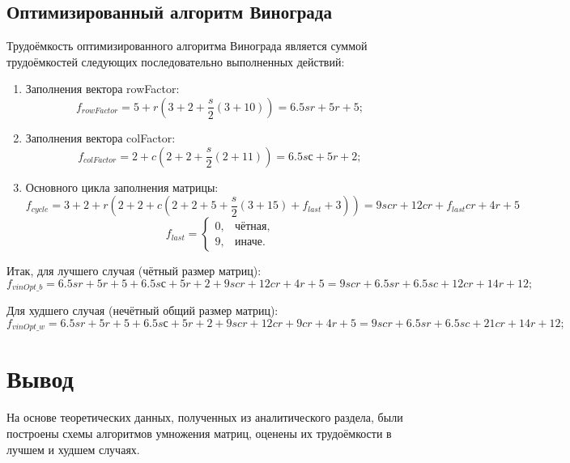 \documentclass[12pt]{report}
\begin{document}
\subsection{Оптимизированный алгоритм Винограда}

Трудоёмкость оптимизированного алгоритма Винограда является суммой трудоёмкостей следующих последовательно выполненных действий:
\begin{enumerate}
	\item Заполнения вектора rowFactor:
	\begin{equation}
		f_{rowFactor} = 5 + r(3 + 2 + \frac{s}{2}(3 + 10)) = 6.5sr + 5r + 5;
	\end{equation}
	
	\item Заполнения вектора colFactor:
	\begin{equation}
		f_{colFactor} = 2 + c(2 + 2 + \frac{s}{2}(2 + 11)) = 6.5sс + 5r + 2;
	\end{equation}
	
	\item Основного цикла заполнения матрицы:
	\begin{equation}
		f_{cycle} = 3 + 2 + r(2 + 2 + c(2 + 2 + 5 + \frac{s}{2}(3 + 15) + f_{last} + 3)) = 9scr + 12cr + f_{last}cr + 4r + 5
	\end{equation}
	\begin{equation}
		f_{last} = \begin{cases}
			0, & \text{чётная,}\\
			9, & \text{иначе.}
		\end{cases}
	\end{equation}
\end{enumerate}

Итак, для лучшего случая (чётный размер матриц): 
\begin{equation}
	f_{vinOpt\_b} = 6.5sr + 5r + 5 + 6.5sс + 5r + 2 + 9scr + 12cr + 4r + 5 = 9scr + 6.5sr + 6.5sc + 12cr + 14r + 12;
\end{equation}

Для худшего случая (нечётный общий размер матриц): 
\begin{equation}
	f_{vinOpt\_w} = 6.5sr + 5r + 5 + 6.5sс + 5r + 2 + 9scr + 12cr + 9cr + 4r + 5 = 9scr + 6.5sr + 6.5sc + 21cr + 14r + 12;
\end{equation}

\section{Вывод}
На основе теоретических данных, полученных из аналитического раздела, были построены схемы алгоритмов умножения матриц, оценены их трудоёмкости в лучшем и худшем случаях.
\end{document}
